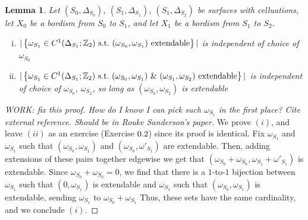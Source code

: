 \documentclass{article}
\newtheorem{lemma}{Lemma}[section]
\theoremstyle{definition}
\numberwithin{figure}{section}
\begin{document}
\begin{lemma}\label{independence} Let $(S_0,\Delta_{S_0})$, $(S_1,\Delta_{S_1})$, $(S_1,\Delta_{S_2})$ be surfaces with celluations, let $X_0$ be a bordism from $S_0$ to $S_1$, and let $X_1$ be a bordism from $S_1$ to $S_2$.

\begin{enumerate}[(i)]
\item $|\left\{\omega_{S_1}\in C^1(\Delta_{S_1};\mathbb{Z}_2) \,\,\mathrm{s.t.}\,\, (\omega_{S_0},\omega_{S_1}) \text{ extendable}\right\}|$ is independent of choice of $\omega_{S_0}$
\item $|\left\{\omega_{S_1}\in C^1(\Delta_{S_1};\mathbb{Z}_2)\,\,\mathrm{s.t.}\,\, (\omega_{S_0},\omega_{S_1})\,\, \& \,\,(\omega_{S_1},\omega_{S_2})\text{ extendable}\right\}|$ is independent of choice of $\omega_{S_0}$, $\omega_{S_2}$, so long as $(\omega_{S_0},\omega_{S_2})$ is extendable
\end{enumerate}
\end{lemma}
\begin{proof} [WORK: fix this proof. How do I know I can pick such $\omega_{S_1}$ in the first place? Cite external reference. Should be in Rouke Sanderson's paper] We prove $(i)$, and leave $(ii)$ as an exercise (Exercise $\thesection.2$) since its proof is identical. Fix $\omega_{S_1}$ and $\omega_{S_1}$ such that $(\omega_{S_0},\omega_{S_1})$ and $(\omega_{S_0},\omega'_{S_1})$ are extendable. Then, adding extensions of these pairs together edgewise we get that $(\omega_{S_0}+\omega_{S_0},\omega_{S_1}+\omega'_{S_1})$ is extendable. Since $\omega_{S_0}+\omega_{S_0}=0$, we find that there is a $1$-to-$1$ bijection between $\omega_{S_1}$ such that $(0,\omega_{S_1})$ is extendable and $\omega_{S_1}$ such that $(\omega_{S_0},\omega_{S_1})$ is extendable, sending $\omega_{S_1}$ to $\omega_{S_0}+\omega_{S_1}$ Thus, these sets have the same cardinality, and we conclude $(i)$.
\end{proof}
\end{document}
